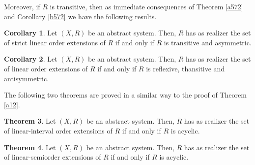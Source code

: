 \documentclass{article}
\theoremstyle{definition}
\newtheorem{theorem}{Theorem}[section]
\newtheorem{corollary}[theorem]{Corollary}
\begin{document}
Moreover, if $R$ is transitive, then
as immediate consequences of Theorem \ref{a572} and Corollary \ref{b572} we have the following results.



\begin{corollary}\label{d572} Let $(X,R)$ be an abstract system. Then,
$R$ has as realizer the set of strict linear order extensions of $R$ if and only if $R$ is transitive and asymmetric.   
\end{corollary}



\begin{corollary}\label{e572} Let $(X,R)$ be an abstract system. Then,
$R$ has as realizer the set of linear order extensions of $R$ if and only if $R$ is 
reflexive, thansitive and antisymmetric.   
\end{corollary}





The following two theorems are proved in a similar way to the proof of Theorem \ref{a12}.


\begin{theorem}\label{aa122} {\rm Let $(X,R)$ be an abstract system. Then,
$\overline{R}$ has as realizer the set of linear-interval order extensions of $R$ if and only if $R$ is acyclic. } 
\end{theorem}




\begin{theorem}\label{aa12} {\rm Let $(X,R)$ be an abstract system. Then,
$\overline{R}$ has as realizer the set of linear-semiorder extensions of $R$ if and only if $R$ is acyclic. } 
\end{theorem}
\end{document}
